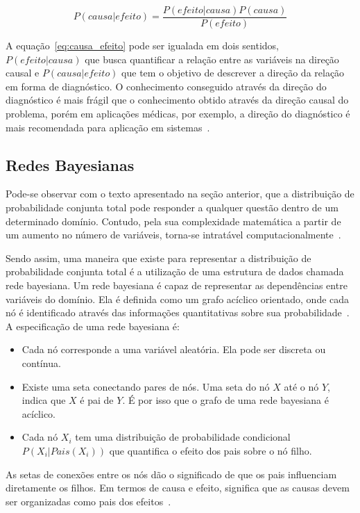\begin{equation}
    \label{eq:causa_efeito}
    P(causa|efeito) = \frac{P(efeito|causa)P(causa)}{P(efeito)}
\end{equation}

A equação~\ref{eq:causa_efeito} pode ser igualada em dois sentidos, $P(efeito|causa)$ que busca quantificar a relação entre as variáveis na direção causal e $P(causa|efeito)$ que tem o objetivo de descrever a direção da relação em forma de diagnóstico. O conhecimento conseguido através da direção do diagnóstico é mais frágil que o conhecimento obtido através da direção causal do problema, porém em aplicações médicas, por exemplo, a direção do diagnóstico é mais recomendada para aplicação em sistemas~\cite{russell:2002}.

\subsection{Redes Bayesianas}
\label{sec:redes-bayesianas}
Pode-se observar com o texto apresentado na seção anterior, que a distribuição de probabilidade conjunta total pode responder a qualquer questão dentro de um determinado domínio. Contudo, pela sua complexidade matemática a partir de um aumento no número de variáveis, torna-se intratável computacionalmente~\cite{russell:2002}.

Sendo assim, uma maneira que existe para representar a distribuição de probabilidade conjunta total é a utilização de uma estrutura de dados chamada rede bayesiana. Um rede bayesiana é capaz de representar as dependências entre variáveis do domínio. Ela é definida como um grafo acíclico orientado, onde cada nó é identificado através das informações quantitativas sobre sua probabilidade~\cite{russell:2002}. A especificação de uma rede bayesiana é:

\begin{itemize}
    \item Cada nó corresponde a uma variável aleatória. Ela pode ser discreta ou contínua.
    \item Existe uma seta conectando pares de nós. Uma seta do nó $X$ até o nó $Y$, indica que $X$ é pai de $Y$. É por isso que o grafo de uma rede bayesiana é acíclico.
    \item Cada nó $X_i$ tem uma distribuição de probabilidade condicional $P(X_i|Pais(X_i))$ que quantifica o efeito dos pais sobre o nó filho.
\end{itemize}

As setas de conexões entre os nós dão o significado de que os pais influenciam diretamente os filhos. Em termos de causa e efeito, significa que as causas devem ser organizadas como pais dos efeitos~\cite{russell:2002}.

